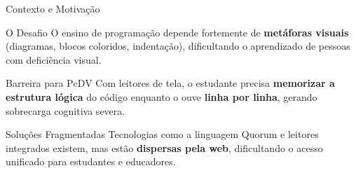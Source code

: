 \documentclass[aspectratio=169]{beamer}
\begin{document}
\begin{frame}{Contexto e Motivação}
    \begin{block}{O Desafio}
        O ensino de programação depende fortemente de \textbf{metáforas visuais} (diagramas, blocos coloridos, indentação), dificultando o aprendizado de pessoas com deficiência visual.
    \end{block}

    \begin{alertblock}{Barreira para PcDV}
        Com leitores de tela, o estudante precisa \textbf{memorizar a estrutura lógica} do código enquanto o ouve \textbf{linha por linha}, gerando sobrecarga cognitiva severa.
    \end{alertblock}

    \begin{exampleblock}{Soluções Fragmentadas}
        Tecnologias como a linguagem Quorum e leitores integrados existem, mas estão \textbf{dispersas pela web}, dificultando o acesso unificado para estudantes e educadores.
    \end{exampleblock}

\end{frame}
\end{document}
